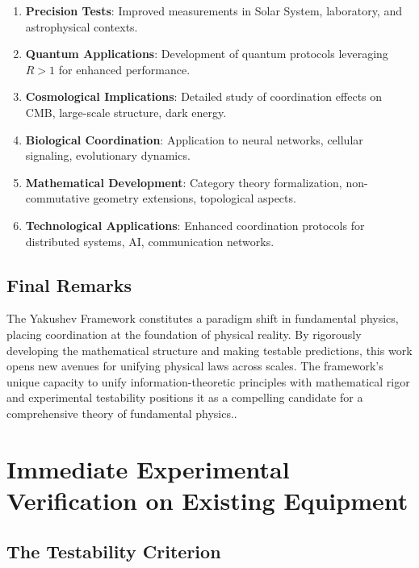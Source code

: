 \documentclass[11pt,a4paper]{article}
\begin{document}
	\begin{enumerate}
		\item \textbf{Precision Tests}: Improved measurements in Solar System, laboratory, and astrophysical contexts.
		
		\item \textbf{Quantum Applications}: Development of quantum protocols leveraging $R>1$ for enhanced performance.
		
		\item \textbf{Cosmological Implications}: Detailed study of coordination effects on CMB, large-scale structure, dark energy.
		
		\item \textbf{Biological Coordination}: Application to neural networks, cellular signaling, evolutionary dynamics.
		
		\item \textbf{Mathematical Development}: Category theory formalization, non-commutative geometry extensions, topological aspects.
		
		\item \textbf{Technological Applications}: Enhanced coordination protocols for distributed systems, AI, communication networks.
	\end{enumerate}
	
	\subsection{Final Remarks}
	
	The Yakushev Framework constitutes a paradigm shift in fundamental physics, placing coordination at the foundation of physical reality. By rigorously developing the mathematical structure and making testable predictions, this work opens new avenues for unifying physical laws across scales. The framework's unique capacity to unify information-theoretic principles with mathematical rigor and experimental testability positions it as a compelling candidate for a comprehensive theory of fundamental physics..
	\section{Immediate Experimental Verification on Existing Equipment}
	\label{sec:immediate-verification}
	
	\subsection{The Testability Criterion}
	
\end{document}
